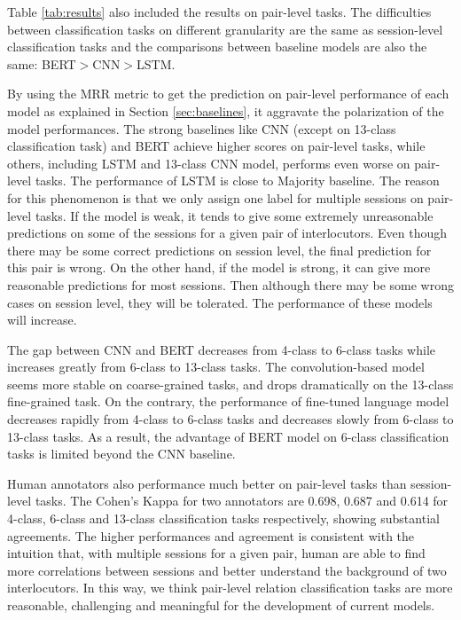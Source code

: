 \documentclass[letterpaper]{article} \usepackage{aaai21}  \usepackage{times}  \usepackage{helvet} \usepackage{courier}  \usepackage[hyphens]{url}  \usepackage{graphicx} \usepackage{xcolor}
\begin{document}
\label{sec:pair}
Table \ref{tab:results} also included the results on pair-level tasks. The difficulties between classification tasks on different granularity are the same as session-level classification tasks and the comparisons between baseline models are also the same: BERT$>$CNN$>$LSTM. 

By using the MRR metric to get the prediction on pair-level performance of each model as explained in Section \ref{sec:baselines}, it aggravate the polarization of the model performances. The strong baselines like CNN (except on 13-class classification task) and BERT achieve higher scores on pair-level tasks, while others, including LSTM and 13-class CNN model, performs even worse on pair-level tasks. The performance of LSTM is close to Majority baseline. The reason for this phenomenon is that we only assign one label for multiple sessions on pair-level tasks. If the model is weak, it tends to give some extremely unreasonable predictions on some of the sessions for a given pair of interlocutors. Even though there may be some correct predictions on session level, the final prediction for this pair is wrong. On the other hand, if the model is strong, it can give more reasonable predictions for most sessions. Then although there may be some wrong cases on session level, they will be tolerated. The performance of these models will increase.

The gap between CNN and BERT decreases from 4-class to 6-class tasks while increases greatly from 6-class to 13-class tasks. The convolution-based model seems more stable on coarse-grained tasks, and drops dramatically on the 13-class fine-grained task. On the contrary, the performance of fine-tuned language model decreases rapidly from 4-class to 6-class tasks and decreases slowly from 6-class to 13-class tasks. As a result, the advantage of BERT model on 6-class classification tasks is limited beyond the CNN baseline.

Human annotators also performance much better on pair-level tasks than session-level tasks. The Cohen's Kappa for two annotators are 0.698, 0.687 and 0.614 for 4-class, 6-class and 13-class classification tasks respectively, showing substantial agreements. The higher performances and agreement is consistent with the intuition that, with multiple sessions for a given pair, human are able to find more correlations between sessions and better understand the background of two interlocutors. In this way, we think pair-level relation classification tasks are more reasonable, challenging and meaningful for the development of current models. 
\end{document}
